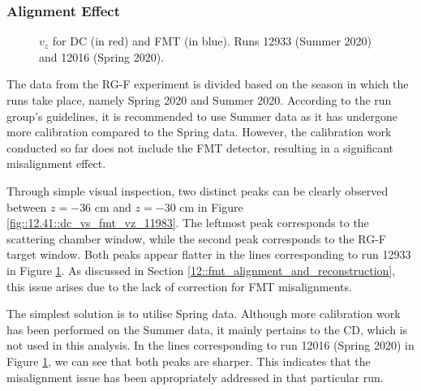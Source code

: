 \subsubsection{Alignment Effect}
\label{14.11::alignment_effect}

    \begin{figure}[b!]
        \caption[$v_z$ for DC and FMT for runs 12933 and 12016]
        {$v_z$ for DC (in red) and FMT (in blue).
        Runs 12933 (Summer 2020) and 12016 (Spring 2020).}
        \label{fig::14.11::vz_seasons}
    \end{figure}

    The data from the RG-F experiment is divided based on the season in which the runs take place, namely Spring 2020 and Summer 2020.
    According to the run group's guidelines, it is recommended to use Summer data as it has undergone more calibration compared to the Spring data.
    However, the calibration work conducted so far does not include the FMT detector, resulting in a significant misalignment effect.

    Through simple visual inspection, two distinct peaks can be clearly observed between $z = -36$ cm and $z = -30$ cm in Figure \ref{fig::12.41::dc_vs_fmt_vz_11983}.
    The leftmost peak corresponds to the scattering chamber window, while the second peak corresponds to the RG-F target window.
    Both peaks appear flatter in the lines corresponding to run 12933 in Figure \ref{fig::14.11::vz_seasons}.
    As discussed in Section \ref{12::fmt_alignment_and_reconstruction}, this issue arises due to the lack of correction for FMT misalignments.

    The simplest solution is to utilise Spring data.
    Although more calibration work has been performed on the Summer data, it mainly pertains to the CD, which is not used in this analysis.
    In the lines corresponding to run 12016 (Spring 2020) in Figure \ref{fig::14.11::vz_seasons}, we can see that both peaks are sharper.
    This indicates that the misalignment issue has been appropriately addressed in that particular run.
